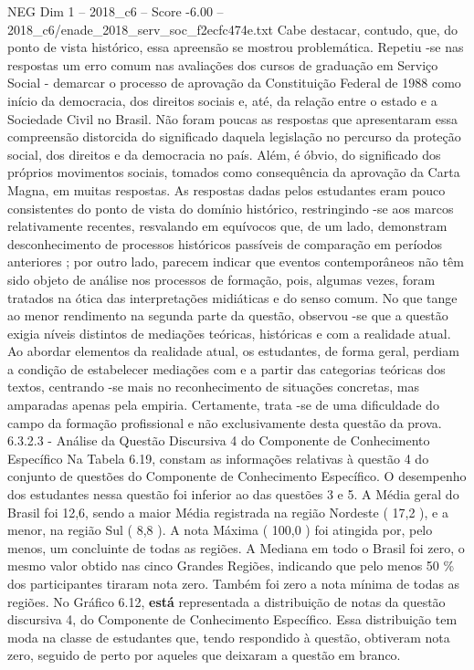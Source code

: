 \begin{textsample}{NEG Dim 1 – 2018\_c6 – Score -6.00 – 2018\_c6/enade\_2018\_serv\_soc\_f2ecfc474e.txt}
Cabe destacar, contudo, que, do ponto de vista histórico, essa apreensão se mostrou problemática.
Repetiu -se nas respostas um erro comum nas avaliações dos cursos de graduação em Serviço Social - demarcar o processo de aprovação da Constituição Federal de 1988 como início da democracia, dos direitos sociais e, até, da relação entre o estado e a Sociedade Civil no Brasil.
Não foram poucas as respostas que apresentaram essa compreensão distorcida do significado daquela legislação no percurso da proteção social, dos direitos e da democracia no país.
Além, é óbvio, do significado dos próprios movimentos sociais, tomados como consequência da aprovação da Carta Magna, em muitas respostas.
As respostas dadas pelos estudantes eram pouco consistentes do ponto de vista do domínio histórico, restringindo -se aos marcos relativamente recentes, resvalando em equívocos que, de um lado, demonstram desconhecimento de processos históricos passíveis de comparação em períodos anteriores ; por outro lado, parecem indicar que eventos contemporâneos não têm sido objeto de análise nos processos de formação, pois, algumas vezes, foram tratados na ótica das interpretações midiáticas e do senso comum.
No que tange ao menor rendimento na segunda parte da questão, observou -se que a questão exigia níveis distintos de mediações teóricas, históricas e com a realidade atual.
Ao abordar elementos da realidade atual, os estudantes, de forma geral, perdiam a condição de estabelecer mediações com e a partir das categorias teóricas dos textos, centrando -se mais no reconhecimento de situações concretas, mas amparadas apenas pela empiria.
Certamente, trata -se de uma dificuldade do campo da formação profissional e não exclusivamente desta questão da prova. 6.3.2.3 - Análise da Questão Discursiva 4 do Componente de Conhecimento Específico Na Tabela 6.19, constam as informações relativas à questão 4 do conjunto de questões do Componente de Conhecimento Específico.
O desempenho dos estudantes nessa questão foi inferior ao das questões 3 e 5.
A Média geral do Brasil foi 12,6, sendo a maior Média registrada na região Nordeste ( 17,2 ), e a menor, na região Sul ( 8,8 ).
A nota Máxima ( 100,0 ) foi atingida por, pelo menos, um concluinte de todas as regiões.
A Mediana em todo o Brasil foi zero, o mesmo valor obtido nas cinco Grandes Regiões, indicando que pelo menos 50 \% dos participantes tiraram nota zero.
Também foi zero a nota mínima de todas as regiões.
No Gráfico 6.12, \textbf{está} representada a distribuição de notas da questão discursiva 4, do Componente de Conhecimento Específico.
Essa distribuição tem moda na classe de estudantes que, tendo respondido à questão, obtiveram nota zero, seguido de perto por aqueles que deixaram a questão em branco.

\end{textsample}
